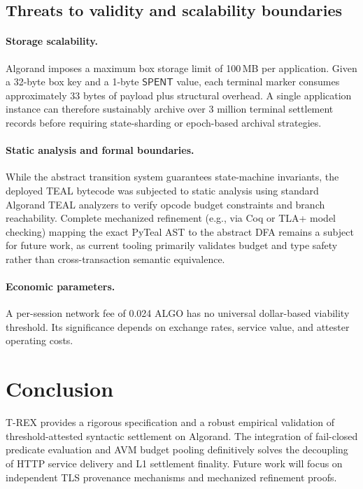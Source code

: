 \documentclass[fleqn,10pt,lineno]{wlpeerj}
\begin{document}
\subsection{Threats to validity and scalability boundaries}

\paragraph{Storage scalability.} 
Algorand imposes a maximum box storage limit of 100\,MB per application. Given a 32-byte box key and a 1-byte $\mathsf{SPENT}$ value, each terminal marker consumes approximately 33 bytes of payload plus structural overhead. A single application instance can therefore sustainably archive over 3 million terminal settlement records before requiring state-sharding or epoch-based archival strategies.

\paragraph{Static analysis and formal boundaries.}
While the abstract transition system guarantees state-machine invariants, the deployed TEAL bytecode was subjected to static analysis using standard Algorand TEAL analyzers to verify opcode budget constraints and branch reachability. Complete mechanized refinement (e.g., via Coq or TLA+ model checking) mapping the exact PyTeal AST to the abstract DFA remains a subject for future work, as current tooling primarily validates budget and type safety rather than cross-transaction semantic equivalence.

\paragraph{Economic parameters.}
A per-session network fee of 0.024 ALGO has no universal dollar-based viability threshold. Its significance depends on exchange rates, service value, and attester operating costs. 

\section{Conclusion}

T-REX provides a rigorous specification and a robust empirical validation of threshold-attested syntactic settlement on Algorand. The integration of fail-closed predicate evaluation and AVM budget pooling definitively solves the decoupling of HTTP service delivery and L1 settlement finality. Future work will focus on independent TLS provenance mechanisms and mechanized refinement proofs.
\end{document}
